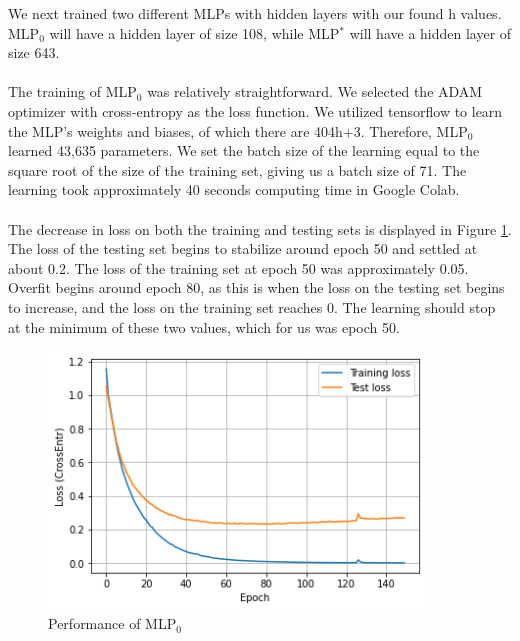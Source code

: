 \documentclass{homework}
\begin{document}
We next trained two different MLPs with hidden layers with our found h values. MLP$_0$ will have a hidden layer of size 108, while MLP$^*$ will have a hidden layer of size 643.\\\\
The training of MLP$_0$ was relatively straightforward. We selected the ADAM optimizer with cross-entropy as the loss function. We utilized tensorflow to learn the MLP's weights and biases, of which there are 404h+3. Therefore, MLP$_0$ learned 43,635 parameters. We set the batch size of the learning equal to the square root of the size of the training set, giving us a batch size of 71. The learning took approximately 40 seconds computing time in Google Colab.\\\\
The decrease in loss on both the training and testing sets is displayed in Figure \ref{MLP0}. The loss of the testing set begins to stabilize around epoch 50 and settled at about 0.2.  The loss of the training set at epoch 50 was approximately 0.05.
Overfit begins around epoch 80, as this is when the loss on the testing set begins to increase, and the loss on the training set reaches 0. The learning should stop at the minimum of these two values, which for us was epoch 50.\\

\begin{figure}[H]
    \centering
    \includegraphics[width=10cm]{mlp0_learning.png}
    \caption{Performance of MLP$_0$}
    \label{MLP0}
\end{figure}
\end{document}
